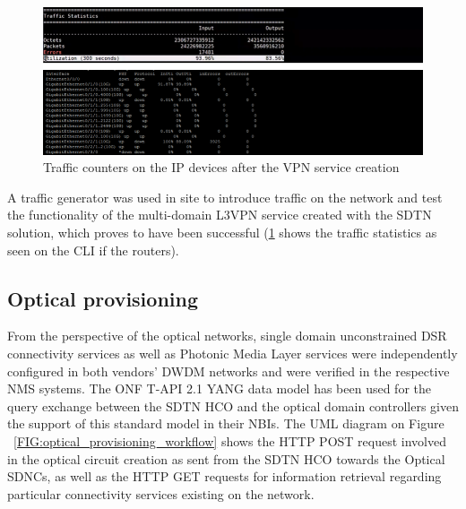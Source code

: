\documentclass[a4paper,fleqn]{cas-dc}
\begin{document}
\begin{figure}
	\centering
		\includegraphics[width=\linewidth]{figs/counters.png}
	\caption{Traffic counters on the IP devices after the VPN service creation}
	\label{FIG:counters}
\end{figure}

A traffic generator was used in site to introduce traffic on the network and test the functionality of the multi-domain L3VPN service created with the SDTN solution, which proves to have been successful (\ref{FIG:counters} shows the traffic statistics as seen on the CLI if the routers).

\subsection{Optical provisioning}
From the perspective of the optical networks, single domain unconstrained DSR connectivity services as well as Photonic Media Layer services were independently configured in both vendors’ DWDM networks and were verified in the respective NMS systems. The ONF T-API 2.1 YANG data model has been used for the query exchange between the SDTN HCO and the optical domain controllers given the support of this standard model in their NBIs. The UML diagram on Figure ~\ref{FIG:optical_provisioning_workflow} shows the HTTP POST request involved in the optical circuit creation as sent from the SDTN HCO towards the Optical SDNCs, as well as the HTTP GET requests for information retrieval regarding particular connectivity services existing on the network. 
\end{document}
